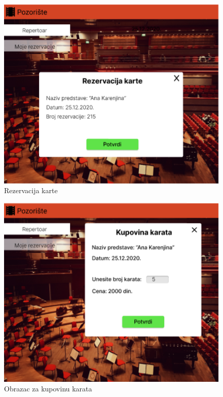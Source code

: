 \documentclass[a4paper]{article}
\begin{document}
\begin{figure}[H]
  \begin{center}
    \includegraphics[width=130mm]{../images/ui_klijent_rezervacija2.png}
  \end{center}
  \caption{Rezervacija karte}
  \label{klijent_rezervacija}
\end{figure}


\begin{figure}[H]
  \begin{center}
    \includegraphics[width=130mm]{../images/ui_klijent_kupovina1.png}
  \end{center}
  \caption{Obrazac za kupovinu karata}
  \label{klijent_kupovina}
\end{figure}
\end{document}
